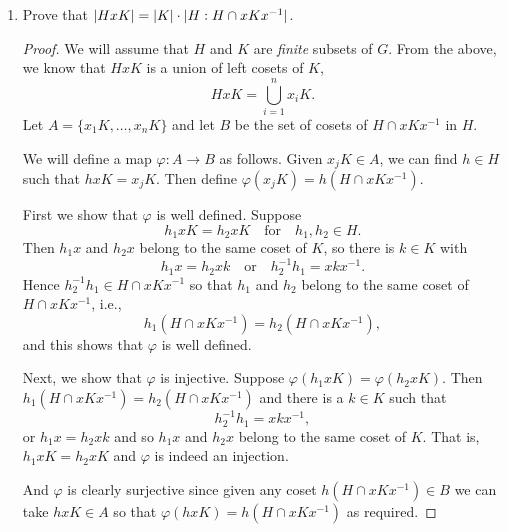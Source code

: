 \begin{enumerate}
\begin{proof}
    Next, each $HK$ double coset $HxK$ is nonempty since
    $x = 1x1\in HxK$. This also shows that every element $x$ in $G$
    belongs to some $HK$ double coset. Therefore the set of $HK$
    double cosets partitions $G$.
  \end{proof}

\item Prove that $\lvert{HxK}\rvert = \lvert{K}\rvert\cdot\lvert{H : H\cap xKx^{-1}}\rvert$.
  \begin{proof}
    We will assume that $H$ and $K$ are {\em finite} subsets of
    $G$. From the above, we know that $HxK$ is a union of left cosets
    of $K$,
    \begin{equation*}
      HxK = \bigcup_{i=1}^nx_iK.
    \end{equation*}
    Let $A = \{x_1K, \dots, x_nK\}$ and let $B$ be the set of cosets
    of $H\cap xKx^{-1}$ in $H$.

    We will define a map $\varphi\colon A\to B$ as follows. Given
    $x_jK\in A$, we can find $h\in H$ such that $hxK = x_jK$. Then
    define $\varphi(x_jK) = h(H\cap xKx^{-1})$.

    First we show that $\varphi$ is well defined. Suppose
    \begin{equation*}
      h_1xK = h_2xK \quad\text{for}\quad h_1,h_2\in H.
    \end{equation*}
    Then $h_1x$ and $h_2x$ belong to the same coset of $K$, so there is
    $k\in K$ with
    \begin{equation*}
      h_1x = h_2xk
      \quad\text{or}\quad
      h_2^{-1}h_1 = xkx^{-1}.
    \end{equation*}
    Hence $h_2^{-1}h_1\in H\cap xKx^{-1}$ so that $h_1$ and $h_2$
    belong to the same coset of $H\cap xKx^{-1}$, i.e.,
    \begin{equation*}
      h_1(H\cap xKx^{-1}) = h_2(H\cap xKx^{-1}),
    \end{equation*}
    and this shows that $\varphi$ is well defined.

    Next, we show that $\varphi$ is injective. Suppose
    $\varphi(h_1xK) = \varphi(h_2xK)$. Then
    $h_1(H\cap xKx^{-1}) = h_2(H\cap xKx^{-1})$ and there is a
    $k\in K$ such that
    \begin{equation*}
      h_2^{-1}h_1 = xkx^{-1},
    \end{equation*}
    or $h_1x = h_2xk$ and so $h_1x$ and $h_2x$ belong to the same
    coset of $K$. That is, $h_1xK = h_2xK$ and $\varphi$ is indeed an
    injection.

    And $\varphi$ is clearly surjective since given any coset
    $h(H\cap xKx^{-1})\in B$ we can take $hxK\in A$ so that
    $\varphi(hxK) = h(H\cap xKx^{-1})$ as required.


\end{proof}
\end{enumerate}
